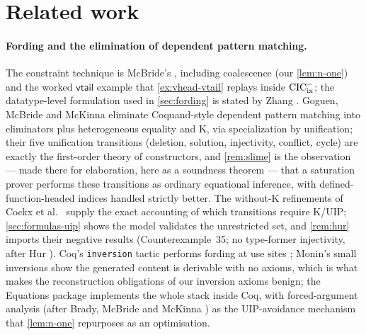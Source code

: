 \section{Related work}
\label{sec:related}

\paragraph{Fording and the elimination of dependent pattern matching.}
The constraint technique is McBride's \cite[\S 3.5]{McBride1999},
including coalescence (our \cref{lem:n-one}) and the worked
$\mathsf{vtail}$ example that \cref{ex:vhead-vtail} replays inside
$\mathrm{CIC}^{-}_{\mathrm{ix}}$; the datatype-level formulation used in \cref{sec:fording} is
stated by Zhang \cite{Zhang2023}.  Goguen, McBride and McKinna
\cite{GoguenEtAl2006} eliminate Coquand-style dependent pattern matching
\cite{Coquand1992} into eliminators plus heterogeneous equality and K,
via specialization by unification; their five unification transitions
(deletion, solution, injectivity, conflict, cycle) are exactly the
first-order theory of constructors, and \cref{rem:slime} is the
observation --- made there for elaboration, here as a soundness theorem
--- that a saturation prover performs these transitions as ordinary
equational inference, with defined-function-headed indices handled
strictly better.  The without-K refinements of Cockx et al.\
\cite{CockxEtAl2014,CockxDevriese2018} supply the exact accounting of
which transitions require K/UIP; \cref{sec:formulas-uip} shows the model
validates the unrestricted set, and \cref{rem:hur} imports their
negative results (Counterexample~35; no type-former injectivity, after
Hur \cite{Hur2010}).  Coq's \texttt{inversion} tactic performs fording
at use sites \cite{CornesTerrasse1995}; Monin's small inversions
\cite{Monin2010} show the generated content is derivable with no
axioms, which is what makes the reconstruction obligations of our
inversion axioms benign; the Equations package \cite{SozeauMangin2019}
implements the whole stack inside Coq, with forced-argument analysis
(after Brady, McBride and McKinna \cite{BradyEtAl2004}) as the
UIP-avoidance mechanism that \cref{lem:n-one} repurposes as an
optimisation.

